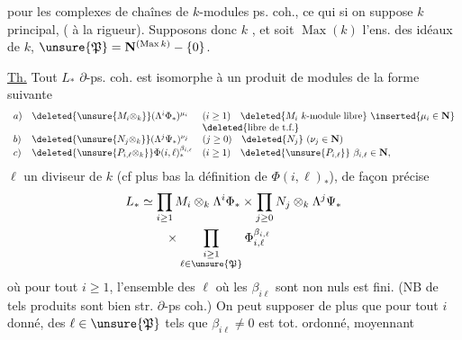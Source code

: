 pour les complexes de chaînes de $k$-modules
ps. coh., ce qui 
si on suppose $k$ principal, (
à la rigueur). Supposons donc
$k$  
,
et soit $\operatorname{Max}(k)$ l'ens.
des idéaux   de $k$,
$\unsure{\mathfrak P}=\mathbf N^{(\operatorname{Max}k)}-\{0\}$.

\uline{Th.} Tout $L_*$  $\partial$-ps. coh. est isomorphe
à un produit de modules de la
forme suivante
\[
\begin{array}{lll}
a)&\deleted{\unsure{M_i\otimes_k}}(\Lambda^i\Phi_*)^{\mu_i}
 &(i\geq1)\quad\deleted{M_i\ k\text{-module libre}}\ \inserted{\mu_i\in\mathbf N}\\
&&\deleted{\text{libre de t.f.}}\\
b)&\deleted{\unsure{N_j\otimes_k}}(\Lambda^j\Psi_*)^{\nu_j}
 &(j\geq0)\quad\deleted{N_j}\ (\nu_j\in\mathbf N)\\
c)&\deleted{\unsure{P_{i,\ell}\otimes_k}}\Phi(i,\ell)_*^{\beta_{i,\ell}}
 &(i\geq1)\quad\deleted{\unsure{P_{i,\ell}}}\ \beta_{i,\ell}\in\mathbf N,
\end{array}
\]
$\ell$ un  diviseur de $k$ (cf plus bas
la définition de $\Phi(i,\ell)_*$), de façon
précise
\[
\begin{split}
L_*&\simeq\prod_{i\geq1}M_i\otimes_k\Lambda^i\Phi_*
\times\prod_{j\geq0}N_j\otimes_k\Lambda^j\Psi_*\\
&\qquad\times\prod_{\substack{i\geq1\\\ell\in\unsure{\mathfrak P}}}
\Phi_{i,\ell}^{\beta_{i,\ell}}
\end{split}
\]
où pour tout
$i\geq1$, l'ensemble des $\ell$ où les $\beta_{i\ell}$ sont non
nuls est fini. (NB de tels
produits sont bien str. $\partial$-ps coh.)
On peut supposer de plus que pour tout
$i$ donné,  des $\ell\in\unsure{\mathfrak P}$  tels
que $\beta_{i\ell}\neq0$ est tot. ordonné, moyennant
